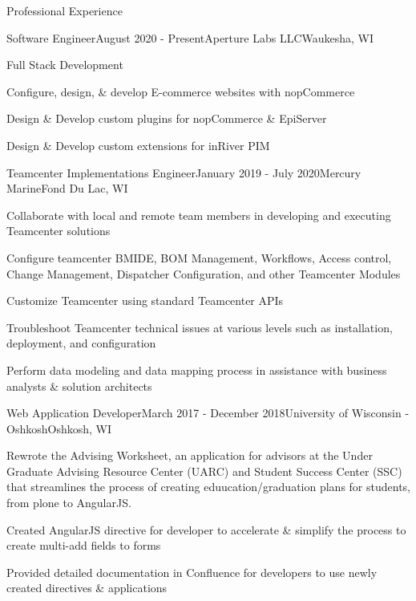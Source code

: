 \documentclass{resume} %
\begin{document}
\begin{rSection}{Professional Experience}

    
    \begin{rSubsection}{Software Engineer}{August 2020 - Present}{Aperture Labs LLC}{Waukesha, WI}
        \item Full Stack Development
        \item Configure, design, \& develop E-commerce websites with nopCommerce
        \item Design & Develop custom plugins for nopCommerce \& EpiServer
        \item Design & Develop custom extensions for inRiver PIM
    \end{rSubsection}

    \begin{rSubsection}{Teamcenter Implementations Engineer}{January 2019 - July 2020}{Mercury Marine}{Fond Du Lac, WI}
        \item Collaborate with local and remote team members in developing and executing Teamcenter solutions
        \item Configure teamcenter BMIDE, BOM Management, Workflows, Access control, Change Management, Dispatcher Configuration, and other Teamcenter Modules
        \item Customize Teamcenter using standard Teamcenter APIs
        \item Troubleshoot Teamcenter technical issues at various levels such as installation, deployment, and configuration
        \item Perform data modeling and data mapping process in assistance with business analysts \& solution architects
    \end{rSubsection}

    \begin{rSubsection}{Web Application Developer}{March 2017 - December 2018}{University of Wisconsin - Oshkosh}{Oshkosh, WI}
        \item Rewrote the Advising Worksheet, an application for advisors at the Under Graduate Advising Resource Center (UARC) and 
            Student Success Center (SSC) that streamlines the process of creating eduucation/graduation plans for students, from 
            plone to AngularJS. 
        \item Created AngularJS directive for developer to accelerate \& simplify the process to create multi-add fields to forms
        \item Provided detailed documentation in Confluence for developers to use newly created directives \& applications
    \end{rSubsection}


\end{rSection}
\end{document}
